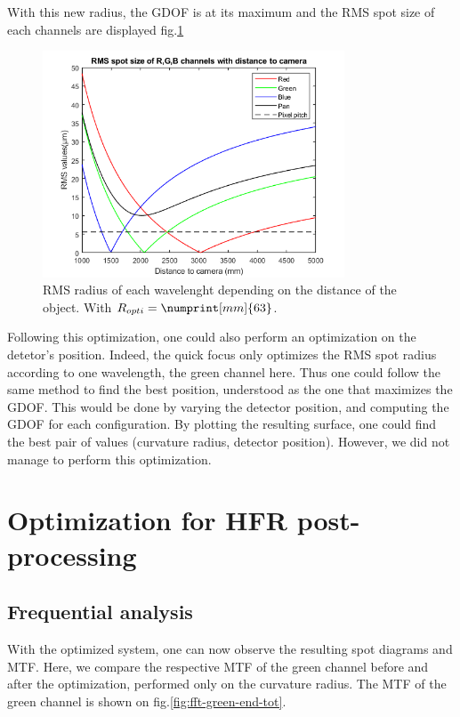 \documentclass[10pt,letterpaper]{article}
\begin{document}
With this new radius, the GDOF is at its maximum and the RMS spot size of each channels are displayed fig.\ref{fig:matlab_gdof}



\begin{figure}[h]
    \centering
    \includegraphics[width=0.8\textwidth]{matlab_gdof.png}
    \caption{RMS radius of each wavelenght depending on the distance of the object. With $R_{opti}=\numprint[mm]{63}$.}
    \label{fig:matlab_gdof}
\end{figure}

Following this optimization, one could also perform an optimization on the detetor's position. Indeed, the quick focus only optimizes the RMS spot radius according to one wavelength, the green channel here. Thus one could follow the same method to find the best position, understood as the one that maximizes the GDOF. This would be done by varying the detector position, and computing the GDOF for each configuration. By plotting the resulting surface, one could find the best pair of values (curvature radius, detector position). However, we did not manage to perform this optimization.

\section{Optimization for HFR post-processing}
\subsection{Frequential analysis}
With the optimized system, one can now observe the resulting spot diagrams and MTF. Here, we compare the respective MTF of the green channel before and after the optimization, performed only on the curvature radius. The MTF of the green channel is shown on fig.\ref{fig:fft-green-end-tot}.
\end{document}
